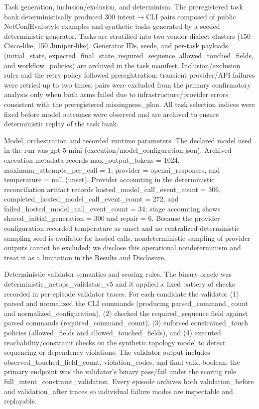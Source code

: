 \documentclass[conference]{IEEEtran}
\begin{document}
Task generation, inclusion/exclusion, and determinism.  The preregistered task bank deterministically produced 300 intent\ensuremath{\rightarrow}CLI pairs composed of public NetConfEval‑style examples and synthetic tasks generated by a seeded deterministic generator. Tasks are stratified into two vendor‑dialect clusters (150 Cisco‑like, 150 Juniper‑like). Generator IDs, seeds, and per‑task payloads (initial\_state, expected\_final\_state, required\_sequence, allowed\_touched\_fields, and workflow\_policies) are archived in the task manifest. Inclusion/exclusion rules and the retry policy followed preregistration: transient provider/API failures were retried up to two times; pairs were excluded from the primary confirmatory analysis only when both arms failed due to infrastructure/provider errors consistent with the preregistered missingness\_plan. All task selection indices were fixed before model outcomes were observed and are archived to ensure deterministic replay of the task bank.

Model, orchestration and recorded runtime parameters.  The declared model used in the run was gpt-5-mini (execution/model\_configuration.json). Archived execution metadata records max\_output\_tokens = 1024, maximum\_attempts\_per\_call = 1, provider = openai\_responses, and temperature = null (unset). Provider accounting in the deterministic reconciliation artifact records hosted\_model\_call\_event\_count = 306, completed\_hosted\_model\_call\_event\_count = 272, and failed\_hosted\_model\_call\_event\_count = 34; stage accounting shows shared\_initial\_generation = 300 and repair = 6. Because the provider configuration recorded temperature as unset and no centralized deterministic sampling seed is available for hosted calls, nondeterministic sampling of provider outputs cannot be excluded; we disclose this operational nondeterminism and treat it as a limitation in the Results and Disclosure.

Deterministic validator semantics and scoring rules.  The binary oracle was deterministic\_netops\_validator\_v5 and it applied a fixed battery of checks recorded in per‑episode validator traces. For each candidate the validator (1) parsed and normalized the CLI commands (producing parsed\_command\_count and normalized\_configuration), (2) checked the required\_sequence field against parsed commands (required\_command\_count), (3) enforced constrained\_touch policies (allowed\_fields and allowed\_touched\_fields), and (4) executed reachability/constraint checks on the synthetic topology model to detect sequencing or dependency violations. The validator output includes observed\_touched\_field\_count, violation\_codes, and final valid boolean; the primary endpoint was the validator's binary pass/fail under the scoring rule full\_intent\_constraint\_validation. Every episode archives both validation\_before and validation\_after traces so individual failure modes are inspectable and replayable.
\end{document}
